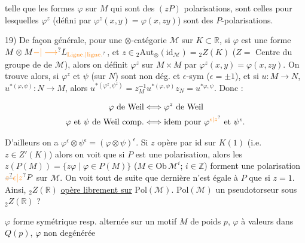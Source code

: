 \margin{\unsure{\ensuremath{\Vert}}}telle que les formes $\varphi$ sur $M$ qui sont des
$(zP)$ polarisations, sont celles pour lesquelles $\varphi^z$
(défini par $\varphi^z(x,y)=\varphi(x,zy)$) sont  des
$P$-polarisations.

19) De façon générale,  pour une $\otimes$-catégorie
$\mathcal M$ sur $K\subset\mathbb R$, si $\varphi$ est une forme
$M\otimes M\unsure{\mathord{-}|\longrightarrow}L_{\unsure{\mathrm{Ligne.}|\mathrm{ligne.}}}$,  et $z\in {}_2\mathrm{Aut}_{\otimes}(\mathrm{id}_{\mathcal M})={}_2Z(K)$
($Z=$ Centre du groupe de   de $\mathcal M$),
alors on définit $\varphi^z$ sur $M\times M$ par
$\varphi^z(x,y)=\varphi(x,zy)$. On trouve alors, si $\varphi^z$ et $\psi$ (sur $N$)
sont non dég. et $\epsilon$-sym ($\epsilon=\pm1$), et si
 $u:M\longrightarrow N$, $u^{*(\varphi,\psi)}:N\longrightarrow M$, alors
$u^{*(\varphi^z,\psi^z)}=z_M^{-1}u^{*(\varphi,\psi)}z_N=u^{*\varphi,\psi}$. Donc : 

\[
\begin{aligned}
\varphi\ \text{de Weil}&\Longleftrightarrow\varphi^z\ \text{de Weil}\\
\varphi\ \text{et}\ \psi\ \text{de Weil comp.}&\Longleftrightarrow\text{idem pour }\varphi^{\unsure{\epsilon|z}}\text{ et }\psi^\epsilon.
\end{aligned}
\]

D'ailleurs on a $\varphi^\epsilon\otimes\psi^\epsilon=(\varphi\otimes\psi)^\epsilon$. 
 Si $z$ opère par id sur $K(1)$
(i.e. $z\in Z'(K)$) alors on voit que si $P$ est
une polarisation, alors les $z(P(M))=\{z\varphi\mid\varphi\in P(M)\}$
($M\in\mathrm{Ob}\,\mathcal M^i$; $i\in\mathbb Z$) forment une polarisation $\deleted{\unsure{z}}\unsure{\epsilon|z}P$ sur $\mathcal M$.
On voit tout de suite que  dernière
n'est égale à $P$ que si $z=1$. Ainsi,
$ {}_2Z(\mathbb R)$ \uline{opère librement sur} $\mathrm{Pol}(\mathcal M)$. 
$\mathrm{Pol}(\mathcal M)$  un pseudotorseur sous $ {}_2Z(\mathbb R)$ ?

\margin{\unsure{\ensuremath{\Vert\;\Vert}}}
$\varphi$ forme symétrique resp. alternée sur un motif $M$ de
poids $p$, $\varphi$ à valeurs dans $Q(p)$, $\varphi$ non
degénérée

